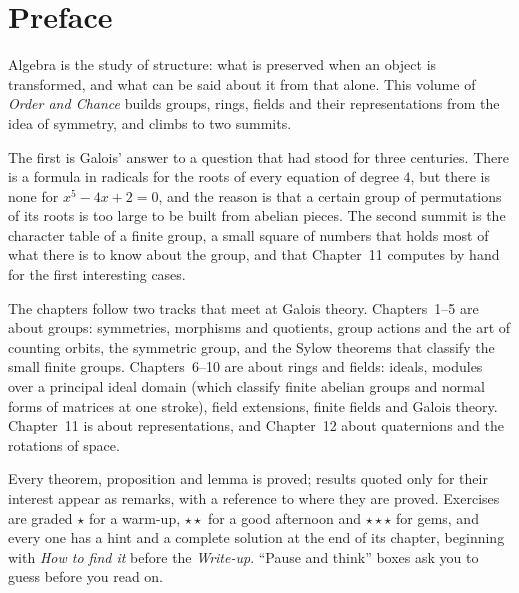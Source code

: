 \chapter*{Preface}
Algebra is the study of structure: what is preserved when an object is transformed, and what can be said about
it from that alone. This volume of \emph{Order and Chance} builds groups, rings, fields and their representations
from the idea of symmetry, and climbs to two summits.

The first is Galois' answer to a question that had stood for three centuries. There is a formula in radicals for
the roots of every equation of degree $4$, but there is none for $x^5-4x+2=0$, and the reason is that a certain
group of permutations of its roots is too large to be built from abelian pieces. The second summit is the
character table of a finite group, a small square of numbers that holds most of what there is to know about the
group, and that Chapter~11 computes by hand for the first interesting cases.

The chapters follow two tracks that meet at Galois theory. Chapters~1--5 are about groups: symmetries, morphisms
and quotients, group actions and the art of counting orbits, the symmetric group, and the Sylow theorems that
classify the small finite groups. Chapters~6--10 are about rings and fields: ideals, modules over a principal ideal
domain (which classify finite abelian groups and normal forms of matrices at one stroke), field extensions,
finite fields and Galois theory. Chapter~11 is about representations, and Chapter~12 about quaternions and the
rotations of space.

Every theorem, proposition and lemma is proved; results quoted only for their interest appear as remarks, with a
reference to where they are proved. Exercises are graded \textbf{$\star$} for a warm-up, \textbf{$\star\star$} for a good
afternoon and \textbf{$\star\star\star$} for gems, and every one has a hint and a complete solution at the end of its
chapter, beginning with \emph{How to find it} before the \emph{Write-up}. ``Pause and think'' boxes ask you to guess
before you read on.
